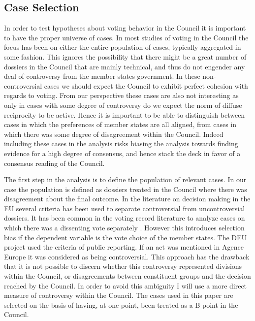 \subsection{Case Selection}

In order to test hypotheses about voting behavior in the Council it is important to have the proper universe of cases. In most studies of voting in the Council the focus has been on either the entire population of cases, typically aggregated in some fashion. This ignores the possibility that there might be a great number of dossiers in the Council that are mainly technical, and thus do not engender any deal of controversy from the member states government. In these non-controversial cases we should expect the Council to exhibit perfect cohesion with regards to voting. From our perspective these cases are also not interesting as only in cases with some degree of controversy do we expect the norm of diffuse reciprocity to be active. Hence it is important to be able to distinguish between cases in which the preferences of member states are all aligned, from cases in which there was some degree of disagreement within the Council. Indeed including these cases in the analysis risks biasing the analysis towards finding evidence for a high degree of consensus, and hence stack the deck in favor of a consensus reading of the Council. 

The first step in the analysis is to define the population of relevant cases. In our case the population is defined as dossiers treated in the Council where there was disagreement about the final outcome. In the literature on decision making in the EU several criteria has been used to separate controversial from uncontroversial dossiers. It has been common in the voting record literature to analyze cases on which there was a dissenting vote separately \citep{Heisenberg2005,Hayes-renshaw2006,Hagemann2008}. However this introduces selection bias if the dependent variable is the vote choice of the member states. The DEU project \citep{Thomson2006a} used the criteria of public reporting. If an act was mentioned in Agence Europe it was considered as being controversial. This approach has the drawback that it is not possible to discern whether this controversy represented divisions within the Council, or disagreements between constituent groups and the decision reached by the Council. In order to avoid this ambiguity I will use a more direct measure of controversy within the Council. The cases used in this paper are selected on the basis of having, at one point, been treated as a B-point in the Council.

